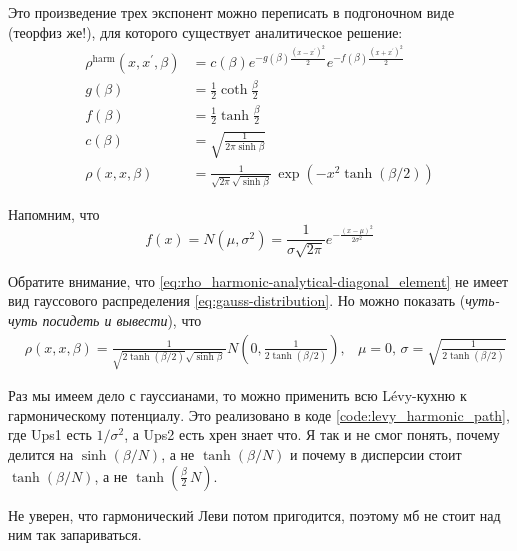 \begin{lecture}
    Это произведение трех экспонент можно переписать в подгоночном виде (теорфиз же!), для которого существует аналитическое решение:
    \begin{align}
        \label{eq:rho_harmonic-analytical}
        \rho^{\mathrm{harm}}\left(x, x^{\prime}, \beta\right) &= c(\beta) e^{-g(\beta) \frac{\left(x-x^{\prime}\right)^{2}}{2}} e^{-f(\beta) \frac{\left(x+x^{\prime}\right)^{2}}{2}} \\
        \label{eq:rho_harmonic-analytical-g}
        g(\beta) &= \frac{1}{2} \operatorname{coth} \frac{\beta}{2} \\ 
        \label{eq:rho_harmonic-analytical-f}
        f(\beta) &=\frac{1}{2} \tanh \frac{\beta}{2} \\ 
        \label{eq:rho_harmonic-analytical-c}
        c(\beta) &=\sqrt{\frac{1}{2 \pi \sinh \beta}} \\
        \label{eq:rho_harmonic-analytical-diagonal_element}
        \rho (x, x, \beta) &= \frac{1}{\sqrt{2\pi} \sqrt{\sinh \beta}}\,\exp\left( -x^2 \tanh(\beta /2) \right)
    \end{align}

    Напомним, что
    \begin{equation}
        \label{eq:gauss-distribution}
        f(x) = N(\mu, \sigma^2) = \frac{1}{\sigma \sqrt{2 \pi}} e^{-\frac{(x-\mu)^{2}}{2 \sigma^{2}}}
    \end{equation}

    Обратите внимание, что \eqref{eq:rho_harmonic-analytical-diagonal_element} не имеет вид гауссового распределения \eqref{eq:gauss-distribution}.
    Но можно показать (\textit{чуть-чуть посидеть и вывести}), что
    \begin{align}
        \label{eq:rho_harmonic-analytical-diagonal_element-via-gaussian}
        & \rho(x, x, \beta) = \frac{1}{\sqrt{2\tanh(\beta /2)} \sqrt{\sinh \beta}\,} N\left(0, \frac{1}{2\tanh (\beta /2)}\right),
        & \mu = 0,\,
        \sigma = \sqrt{\frac{1}{2\tanh(\beta /2)}}
    \end{align}

    Раз мы имеем дело с гауссианами, то можно применить всю Lévy-кухню к гармоническому потенциалу.
    Это реализовано в коде \ref{code:levy_harmonic_path}, где Ups1 есть $1 / \sigma^2$, а Ups2 есть хрен знает что.
    Я так и не смог понять, почему делится на $\sinh(\beta /N)$, а не $\tanh(\beta /N)$ и почему в дисперсии стоит $\tanh(\beta /N)$, а не $\tanh\left(\frac{\beta}{2}\,N\right)$.


    Не уверен, что гармонический Леви потом пригодится, поэтому мб не стоит над ним так запариваться.
\end{lecture}
